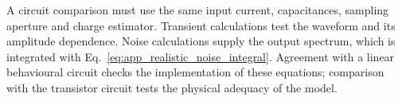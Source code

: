A circuit comparison must use the same input current, capacitances, sampling aperture and charge estimator. Transient calculations test the waveform and its amplitude dependence. Noise calculations supply the output spectrum, which is integrated with Eq.~\eqref{eq:app_realistic_noise_integral}. Agreement with a linear behavioural circuit checks the implementation of these equations; comparison with the transistor circuit tests the physical adequacy of the model.
